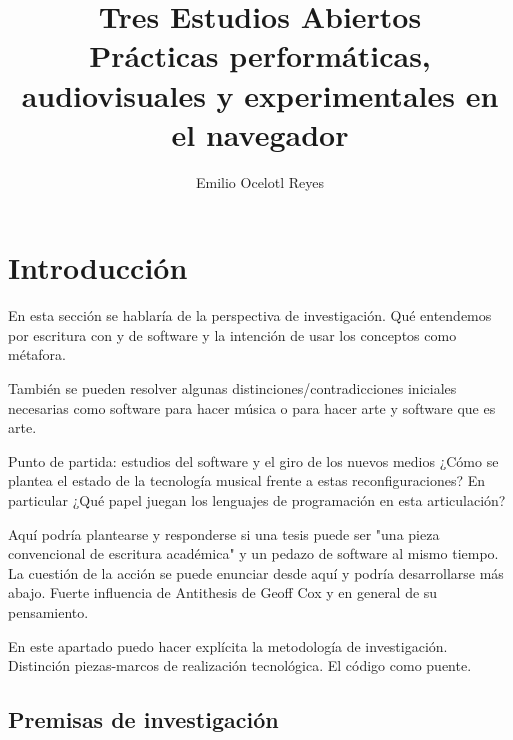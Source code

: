 \documentclass[12pt,a4paper, openright,
headinclude,footinclude,BCOR5mm,
numbers=noenddot,cleardoublepage=empty,
tablecaptionabove]{article}
\author{Emilio Ocelotl Reyes}
\title{%
  Tres Estudios Abiertos \\
  \large Prácticas performáticas, audiovisuales y experimentales en el navegador}
\begin{document}
\maketitle
\pagebreak
\tableofcontents



\section{Introducción}

En esta sección se hablaría de la perspectiva de investigación. Qué entendemos por escritura con y de software y la intención de usar los conceptos como métafora.

También se pueden resolver algunas distinciones/contradicciones iniciales necesarias como software para hacer música o para hacer arte y software que es arte. %

Punto de partida: estudios del software y el giro de los nuevos medios
¿Cómo se plantea el estado de la tecnología musical frente a estas reconfiguraciones? En particular ¿Qué papel juegan los lenguajes de programación en esta articulación? 

Aquí podría plantearse y responderse si una tesis puede ser "una pieza convencional de escritura académica" y un pedazo de software al mismo tiempo. 
La cuestión de la acción se puede enunciar desde aquí y podría desarrollarse más abajo. Fuerte influencia de Antithesis de Geoff Cox y en general de su pensamiento.

En este apartado puedo hacer explícita la metodología de investigación. 
Distinción piezas-marcos de realización tecnológica. El código como puente. 

\subsection{Premisas de investigación}
\end{document}
